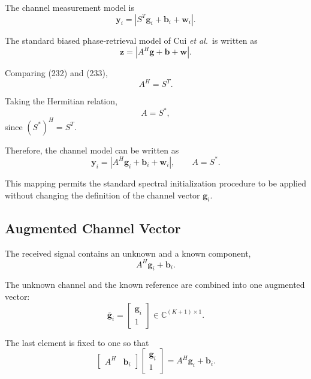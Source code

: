\documentclass[12pt,a4paper]{article}
\begin{document}
The channel measurement model is
\begin{equation}
\mathbf y_i
=
\left|
S^T\mathbf g_i+\mathbf b_i+\mathbf w_i
\right|.
\tag{232}
\end{equation}

The standard biased phase-retrieval model of Cui \emph{et al.}\ is
written as
\begin{equation}
\mathbf z
=
\left|
A^H\mathbf g+\mathbf b+\mathbf w
\right|.
\tag{233}
\end{equation}

Comparing (232) and (233),
\begin{equation}
\boxed{
A^H=S^T
}.
\tag{234}
\end{equation}

Taking the Hermitian relation,
\begin{equation}
A=S^*,
\tag{235}
\end{equation}
since $(S^*)^H=S^T$.

Therefore, the channel model can be written as
\begin{equation}
\boxed{
\mathbf y_i
=
\left|
A^H\mathbf g_i+\mathbf b_i+\mathbf w_i
\right|,
\qquad
A=S^*
}.
\tag{236}
\end{equation}

This mapping permits the standard spectral initialization procedure
to be applied without changing the definition of the channel vector
$\mathbf g_i$.

\subsection{Augmented Channel Vector}

The received signal contains an unknown and a known component,
\begin{equation}
A^H\mathbf g_i+\mathbf b_i.
\tag{237}
\end{equation}

The unknown channel and the known reference are combined into one
augmented vector:
\begin{equation}
\boxed{
\bar{\mathbf g}_i
=
\begin{bmatrix}
\mathbf g_i\\
1
\end{bmatrix}
\in
\mathbb{C}^{(K+1)\times1}
}.
\tag{238}
\end{equation}

The last element is fixed to one so that
\begin{equation}
\begin{bmatrix}
A^H&\mathbf b_i
\end{bmatrix}
\begin{bmatrix}
\mathbf g_i\\
1
\end{bmatrix}
=
A^H\mathbf g_i+\mathbf b_i.
\tag{239}
\end{equation}
\end{document}

